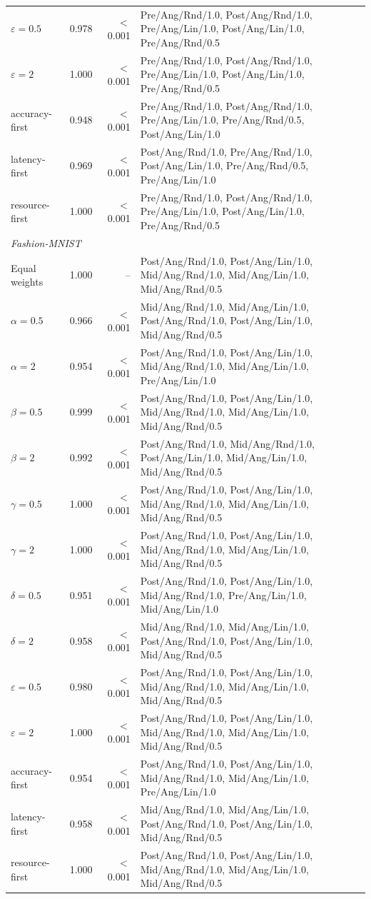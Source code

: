 \begin{table}[!t]
\begin{tabular}{lrrl}
$\varepsilon = 0.5$ & 0.978 & $<$0.001 & Pre/Ang/Rnd/1.0, Post/Ang/Rnd/1.0, Pre/Ang/Lin/1.0, Post/Ang/Lin/1.0, Pre/Ang/Rnd/0.5 \\
$\varepsilon = 2$ & 1.000 & $<$0.001 & Pre/Ang/Rnd/1.0, Post/Ang/Rnd/1.0, Pre/Ang/Lin/1.0, Post/Ang/Lin/1.0, Pre/Ang/Rnd/0.5 \\
accuracy-first & 0.948 & $<$0.001 & Pre/Ang/Rnd/1.0, Post/Ang/Rnd/1.0, Pre/Ang/Lin/1.0, Pre/Ang/Rnd/0.5, Post/Ang/Lin/1.0 \\
latency-first & 0.969 & $<$0.001 & Post/Ang/Rnd/1.0, Pre/Ang/Rnd/1.0, Post/Ang/Lin/1.0, Pre/Ang/Rnd/0.5, Pre/Ang/Lin/1.0 \\
resource-first & 1.000 & $<$0.001 & Pre/Ang/Rnd/1.0, Post/Ang/Rnd/1.0, Pre/Ang/Lin/1.0, Post/Ang/Lin/1.0, Pre/Ang/Rnd/0.5 \\
\midrule
\multicolumn{4}{l}{\textit{Fashion-MNIST}} \\
Equal weights & 1.000 & -- & Post/Ang/Rnd/1.0, Post/Ang/Lin/1.0, Mid/Ang/Rnd/1.0, Mid/Ang/Lin/1.0, Mid/Ang/Rnd/0.5 \\
$\alpha = 0.5$ & 0.966 & $<$0.001 & Mid/Ang/Rnd/1.0, Mid/Ang/Lin/1.0, Post/Ang/Rnd/1.0, Post/Ang/Lin/1.0, Mid/Ang/Rnd/0.5 \\
$\alpha = 2$ & 0.954 & $<$0.001 & Post/Ang/Rnd/1.0, Post/Ang/Lin/1.0, Mid/Ang/Rnd/1.0, Mid/Ang/Lin/1.0, Pre/Ang/Lin/1.0 \\
$\beta = 0.5$ & 0.999 & $<$0.001 & Post/Ang/Rnd/1.0, Post/Ang/Lin/1.0, Mid/Ang/Rnd/1.0, Mid/Ang/Lin/1.0, Mid/Ang/Rnd/0.5 \\
$\beta = 2$ & 0.992 & $<$0.001 & Post/Ang/Rnd/1.0, Mid/Ang/Rnd/1.0, Post/Ang/Lin/1.0, Mid/Ang/Lin/1.0, Mid/Ang/Rnd/0.5 \\
$\gamma = 0.5$ & 1.000 & $<$0.001 & Post/Ang/Rnd/1.0, Post/Ang/Lin/1.0, Mid/Ang/Rnd/1.0, Mid/Ang/Lin/1.0, Mid/Ang/Rnd/0.5 \\
$\gamma = 2$ & 1.000 & $<$0.001 & Post/Ang/Rnd/1.0, Post/Ang/Lin/1.0, Mid/Ang/Rnd/1.0, Mid/Ang/Lin/1.0, Mid/Ang/Rnd/0.5 \\
$\delta = 0.5$ & 0.951 & $<$0.001 & Post/Ang/Rnd/1.0, Post/Ang/Lin/1.0, Mid/Ang/Rnd/1.0, Pre/Ang/Lin/1.0, Mid/Ang/Lin/1.0 \\
$\delta = 2$ & 0.958 & $<$0.001 & Mid/Ang/Rnd/1.0, Mid/Ang/Lin/1.0, Post/Ang/Rnd/1.0, Post/Ang/Lin/1.0, Mid/Ang/Rnd/0.5 \\
$\varepsilon = 0.5$ & 0.980 & $<$0.001 & Post/Ang/Rnd/1.0, Post/Ang/Lin/1.0, Mid/Ang/Rnd/1.0, Mid/Ang/Lin/1.0, Mid/Ang/Rnd/0.5 \\
$\varepsilon = 2$ & 1.000 & $<$0.001 & Post/Ang/Rnd/1.0, Post/Ang/Lin/1.0, Mid/Ang/Rnd/1.0, Mid/Ang/Lin/1.0, Mid/Ang/Rnd/0.5 \\
accuracy-first & 0.954 & $<$0.001 & Post/Ang/Rnd/1.0, Post/Ang/Lin/1.0, Mid/Ang/Rnd/1.0, Mid/Ang/Lin/1.0, Pre/Ang/Lin/1.0 \\
latency-first & 0.958 & $<$0.001 & Mid/Ang/Rnd/1.0, Mid/Ang/Lin/1.0, Post/Ang/Rnd/1.0, Post/Ang/Lin/1.0, Mid/Ang/Rnd/0.5 \\
resource-first & 1.000 & $<$0.001 & Post/Ang/Rnd/1.0, Post/Ang/Lin/1.0, Mid/Ang/Rnd/1.0, Mid/Ang/Lin/1.0, Mid/Ang/Rnd/0.5 \\
\bottomrule
\end{tabular}
\end{table}
